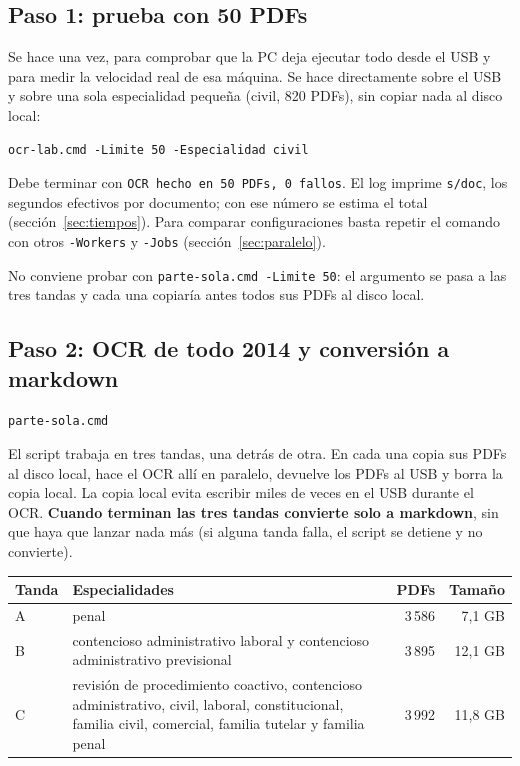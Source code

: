 ﻿\documentclass[11pt,a4paper]{article}
\begin{document}
\subsection{Paso 1: prueba con 50 PDFs}

Se hace una vez, para comprobar que la PC deja ejecutar todo desde el USB y para medir
la velocidad real de esa máquina. Se hace directamente sobre el USB y sobre una sola
especialidad pequeña (civil, 820 PDFs), sin copiar nada al disco local:
\begin{lstlisting}
ocr-lab.cmd -Limite 50 -Especialidad civil
\end{lstlisting}
Debe terminar con \texttt{OCR hecho en 50 PDFs, 0 fallos}. El log imprime \texttt{s/doc},
los segundos efectivos por documento; con ese número se estima el total
(sección~\ref{sec:tiempos}). Para comparar configuraciones basta repetir el comando con
otros \texttt{-Workers} y \texttt{-Jobs} (sección~\ref{sec:paralelo}).

No conviene probar con \texttt{parte-sola.cmd -Limite 50}: el argumento se pasa a las tres
tandas y cada una copiaría antes todos sus PDFs al disco local.

\subsection{Paso 2: OCR de todo 2014 y conversión a markdown}

\begin{lstlisting}
parte-sola.cmd
\end{lstlisting}

El script trabaja en tres tandas, una detrás de otra. En cada una copia sus PDFs al disco
local, hace el OCR allí en paralelo, devuelve los PDFs al USB y borra la copia local. La
copia local evita escribir miles de veces en el USB durante el OCR. \textbf{Cuando
terminan las tres tandas convierte solo a markdown}, sin que haya que lanzar nada más (si
alguna tanda falla, el script se detiene y no convierte).

\begin{center}
\begin{tabular}{lp{8.2cm}rr}
\toprule
Tanda & Especialidades & PDFs & Tamaño \\
\midrule
A & penal & 3\,586 & 7,1 GB \\
B & contencioso administrativo laboral y contencioso administrativo previsional
    & 3\,895 & 12,1 GB \\
C & revisión de procedimiento coactivo, contencioso administrativo, civil, laboral,
    constitucional, familia civil, comercial, familia tutelar y familia penal
    & 3\,992 & 11,8 GB \\
\bottomrule
\end{tabular}
\end{center}
\end{document}
